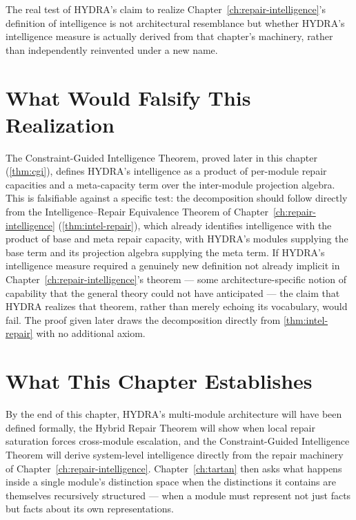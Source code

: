 \documentclass[12pt,twoside,openright]{book}
\begin{document}
The real test of HYDRA's claim to realize
Chapter~\ref{ch:repair-intelligence}'s definition of
intelligence is not architectural resemblance but whether
HYDRA's intelligence measure is actually derived from that
chapter's machinery, rather than independently reinvented under
a new name.

\section{What Would Falsify This Realization}
\label{sec:ch25-falsifiability}

The Constraint-Guided Intelligence Theorem, proved later in
this chapter (\cref{thm:cgi}), defines HYDRA's intelligence as
a product of per-module repair capacities and a meta-capacity
term over the inter-module projection algebra. This is
falsifiable against a specific test: the decomposition should
follow directly from the Intelligence--Repair Equivalence
Theorem of Chapter~\ref{ch:repair-intelligence}
(\cref{thm:intel-repair}), which already identifies
intelligence with the product of base and meta repair
capacity, with HYDRA's modules supplying the base term and its
projection algebra supplying the meta term. If HYDRA's
intelligence measure required a genuinely new definition not
already implicit in Chapter~\ref{ch:repair-intelligence}'s
theorem --- some architecture-specific notion of capability
that the general theory could not have anticipated --- the
claim that HYDRA realizes that theorem, rather than merely
echoing its vocabulary, would fail. The proof given later
draws the decomposition directly from
\cref{thm:intel-repair} with no additional axiom.

\section{What This Chapter Establishes}
\label{sec:ch25-preview}

By the end of this chapter, HYDRA's multi-module architecture
will have been defined formally, the Hybrid Repair Theorem
will show when local repair saturation forces cross-module
escalation, and the Constraint-Guided Intelligence Theorem will
derive system-level intelligence directly from the repair
machinery of Chapter~\ref{ch:repair-intelligence}.
Chapter~\ref{ch:tartan} then asks what happens inside a single
module's distinction space when the distinctions it contains
are themselves recursively structured --- when a module must
represent not just facts but facts about its own
representations.
\end{document}

